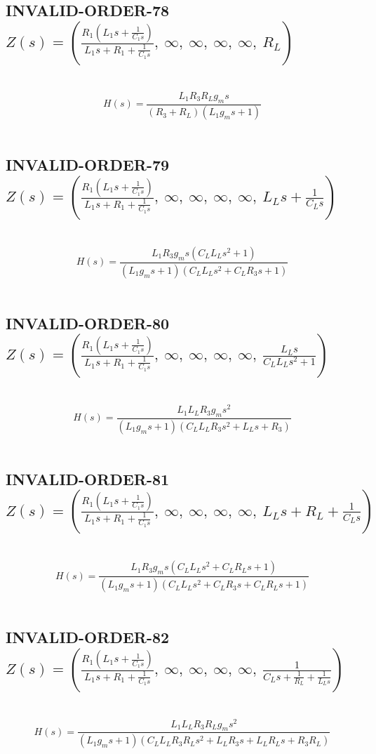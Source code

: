 \documentclass{article}
\begin{document}
\subsection{INVALID-ORDER-78 $Z(s) = \left( \frac{R_{1} \left(L_{1} s + \frac{1}{C_{1} s}\right)}{L_{1} s + R_{1} + \frac{1}{C_{1} s}}, \  \infty, \  \infty, \  \infty, \  \infty, \  R_{L}\right)$ } \ 
\textbf{\[H(s) = \frac{L_{1} R_{3} R_{L} g_{m} s}{\left(R_{3} + R_{L}\right) \left(L_{1} g_{m} s + 1\right)}\] } \ 
\subsection{INVALID-ORDER-79 $Z(s) = \left( \frac{R_{1} \left(L_{1} s + \frac{1}{C_{1} s}\right)}{L_{1} s + R_{1} + \frac{1}{C_{1} s}}, \  \infty, \  \infty, \  \infty, \  \infty, \  L_{L} s + \frac{1}{C_{L} s}\right)$ } \ 
\textbf{\[H(s) = \frac{L_{1} R_{3} g_{m} s \left(C_{L} L_{L} s^{2} + 1\right)}{\left(L_{1} g_{m} s + 1\right) \left(C_{L} L_{L} s^{2} + C_{L} R_{3} s + 1\right)}\] } \ 
\subsection{INVALID-ORDER-80 $Z(s) = \left( \frac{R_{1} \left(L_{1} s + \frac{1}{C_{1} s}\right)}{L_{1} s + R_{1} + \frac{1}{C_{1} s}}, \  \infty, \  \infty, \  \infty, \  \infty, \  \frac{L_{L} s}{C_{L} L_{L} s^{2} + 1}\right)$ } \ 
\textbf{\[H(s) = \frac{L_{1} L_{L} R_{3} g_{m} s^{2}}{\left(L_{1} g_{m} s + 1\right) \left(C_{L} L_{L} R_{3} s^{2} + L_{L} s + R_{3}\right)}\] } \ 
\subsection{INVALID-ORDER-81 $Z(s) = \left( \frac{R_{1} \left(L_{1} s + \frac{1}{C_{1} s}\right)}{L_{1} s + R_{1} + \frac{1}{C_{1} s}}, \  \infty, \  \infty, \  \infty, \  \infty, \  L_{L} s + R_{L} + \frac{1}{C_{L} s}\right)$ } \ 
\textbf{\[H(s) = \frac{L_{1} R_{3} g_{m} s \left(C_{L} L_{L} s^{2} + C_{L} R_{L} s + 1\right)}{\left(L_{1} g_{m} s + 1\right) \left(C_{L} L_{L} s^{2} + C_{L} R_{3} s + C_{L} R_{L} s + 1\right)}\] } \ 
\subsection{INVALID-ORDER-82 $Z(s) = \left( \frac{R_{1} \left(L_{1} s + \frac{1}{C_{1} s}\right)}{L_{1} s + R_{1} + \frac{1}{C_{1} s}}, \  \infty, \  \infty, \  \infty, \  \infty, \  \frac{1}{C_{L} s + \frac{1}{R_{L}} + \frac{1}{L_{L} s}}\right)$ } \ 
\textbf{\[H(s) = \frac{L_{1} L_{L} R_{3} R_{L} g_{m} s^{2}}{\left(L_{1} g_{m} s + 1\right) \left(C_{L} L_{L} R_{3} R_{L} s^{2} + L_{L} R_{3} s + L_{L} R_{L} s + R_{3} R_{L}\right)}\] } \ 
\end{document}

